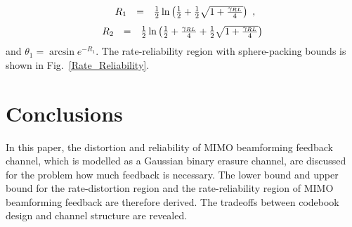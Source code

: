 \documentclass[10pt,fleqn, twocolumn]{IEEEtran}
\begin{document}
\begin{equation}\hspace{-0.0in}
\begin{array}{rcl}
R_{1}&=&\frac{1}{2}\ln\left(\frac{1}{2}+\frac{1}{2}\sqrt{1+\frac{\gamma_{\mbox{\tiny
RL}}}{4}}\right)
\end{array},
\end{equation}
\begin{equation}\hspace{-0.0in}
\begin{array}{rcl}
R_{2}&=&\frac{1}{2}\ln\left(\frac{1}{2}+\frac{\gamma_{\mbox{\tiny
RL}}}{4}+\frac{1}{2}\sqrt{1+\frac{\gamma_{\mbox{\tiny
RL}}}{4}}\right)
\end{array}
\end{equation}
\noindent and $\theta_{1}=\arcsin e^{-R_{1}}$. The
rate-reliability region with sphere-packing bounds is shown in
Fig.~\ref{Rate_Reliability}.

\begin{figure}
\end{figure}

\section{Conclusions}
In this paper, the distortion and reliability of MIMO beamforming
feedback channel, which is modelled as a Gaussian binary erasure
channel, are discussed for the problem how much feedback is
necessary. The lower bound and upper bound for the rate-distortion
region and the rate-reliability region of MIMO beamforming
feedback are therefore derived. The tradeoffs between codebook
design and channel structure are revealed.

\small


\end{document}
